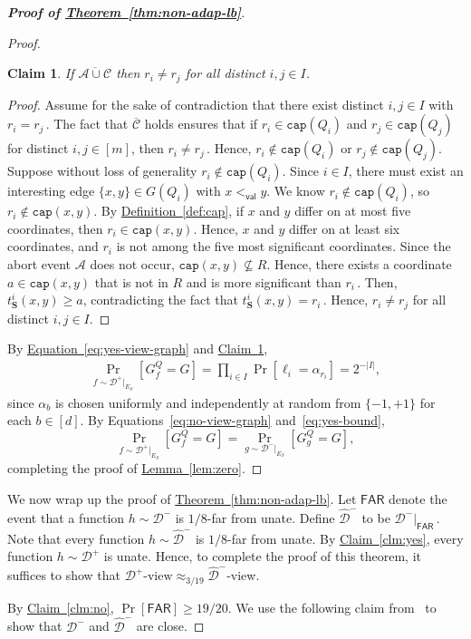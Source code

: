\documentclass[11pt]{article}
\numberwithin{equation}{section}
\newtheorem{claim}[theorem]{Claim}
\theoremstyle{definition}
\theoremstyle{plain}
\newcommand{\expref}[2]{\hyperref[#2]{#1~\ref{#2}}}
\newcommand{\expeqref}[2]{\hyperref[#2]{#1~\eqref{#2}}}
\newcommand{\bS}{\ensuremath{\mathbf{S}}}
\newcommand{\cA}{\ensuremath{\mathcal{A}}}
\newcommand{\cC}{\ensuremath{\mathcal{C}}}
\newcommand{\Yes}{\ensuremath{\mathcal{D}^+}}
\newcommand{\No}{\ensuremath{\mathcal{D}^-}}
\newcommand{\Far}{\ensuremath{\mathsf{FAR}}}
\newcommand{\FarNo}{\ensuremath{\widehat{\mathcal{D}}^-}}
\newcommand{\order}{\ensuremath{<_\dec}}
\newcommand{\goodS}{\ensuremath{E_S}}
\newcommand{\coord}[2]{t^{#1}_{#2}}
\newcommand{\capt}{\mathtt{cap}}
\newcommand{\dec}{\mathsf{val}}
\newcommand{\Thm}[1]{\expref{Theorem}{thm:#1}}
\newcommand{\Lem}[1]{\expref{Lemma}{lem:#1}}
\newcommand{\Clm}[1]{\expref{Claim}{clm:#1}}
\newcommand{\Def}[1]{\expref{Definition}{def:#1}}
\begin{document}
\begin{proof}[{\bf Proof of \Thm{non-adap-lb}}]
\begin{proof}
\begin{claim}\label{clm:good-events}
If $\overline{\cA \cup \cC}$ then $r_i \neq r_j$ for all distinct $i,j \in I$.
\end{claim}
\begin{proof}
Assume for the sake of contradiction that there exist distinct $i,j \in I$ 
with $r_i = r_j$\,. %
The fact that $\overline{\cC}$ holds ensures that if $r_i \in \capt(Q_i)$ and $r_j \in \capt(Q_j)$ for distinct $i, j \in [m]$, 
then $r_i \neq r_j$\,. %
Hence, $r_i \notin \capt(Q_i)$ or $r_j \notin \capt(Q_j)$. Suppose without loss of generality $r_i \notin \capt(Q_i)$.
Since $i \in I$, there must exist an interesting edge $\{x,y\} \in G(Q_i)$ with $x \order y$. We know $r_i \notin \capt(Q_i)$, so $r_i \notin \capt(x,y)$. By \Def{cap}, if $x$ and $y$ differ on at most five coordinates, then $r_i \in \capt(x,y)$. Hence, $x$ and $y$ differ on at least six coordinates, and $r_i$ is not among the five most significant coordinates. Since the abort event $\cA$ does not occur, $\capt(x,y) \nsubseteq R$. Hence, there exists a coordinate $a \in \capt(x,y)$ that is not in $R$ and is 
more significant than $r_i$\,. %
Then, $\coord{i}{\bS}(x,y) \geq a$, contradicting the fact that $\coord{i}{\bS}(x,y) = r_i$\,. %
Hence, $r_i \neq r_j$ for all distinct $i,j \in I$.
\end{proof}

By \expeqref{Equation}{eq:yes-view-graph} and \Clm{good-events},
\begin{align}
\Pr\limits_{f \sim \Yes|_{\goodS}}[G^Q_f = G] = \prod\limits_{i \in I} \Pr[\ell_i = \alpha_{r_i}] = 2^{-|I|}, \label{eq:yes-bound}
\end{align}
since $\alpha_b$ is chosen uniformly and independently at random from $\{-1, +1\}$ for each $b \in [d]$. By Equations~\eqref{eq:no-view-graph} and~\eqref{eq:yes-bound},
\[\Pr_{f\sim \Yes|_{\goodS}} [G^Q_f = G] = \Pr_{g\sim \No|_{\goodS}} [G^Q_g = G],\]
%
%
completing the proof of \Lem{zero}.
%
\end{proof}

We now wrap up the proof of \Thm{non-adap-lb}.
Let $\Far$ denote the event that a function $h \sim \No$ is ${1}/{8}$-far from unate.
Define $\FarNo$ to be $\No|_\Far$\,. %
Note that every function $h \sim \FarNo$ is ${1}/{8}$-far from unate. By \Clm{yes}, every function $h \sim \Yes$ is unate. Hence, to complete the proof of this theorem, it suffices to show that $\Yes\text{-view} \approx_{3/19} \FarNo$-view.

By \Clm{no}, $\Pr[\Far] \geq 19/20$.
We use the following claim from~\cite{RS06} %
to show that $\No$ and $\FarNo$ are close.


\end{proof}
\end{document}
